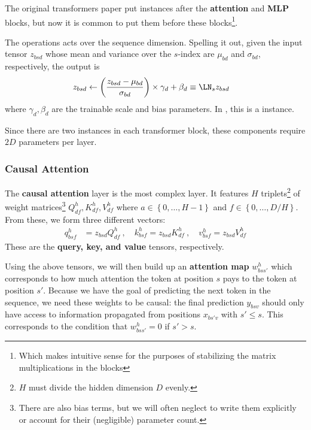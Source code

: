 \documentclass[11pt]{article}
\begin{document}
The original transformers paper \cite{vaswani2017attention} put  instances after
the \textbf{attention} and \textbf{MLP} blocks, but now it is common \cite{xiong2020layer} to put
them before these blocks\footnote{Which makes intuitive sense for the purposes of stabilizing the
matrix multiplications in the blocks}.

The  operations acts over the sequence dimension. Spelling it out, given the
input tensor $ z _{ bsd } $ whose mean and variance over the $ s $-index are $ \mu _{ bd } $ and $
\sigma _{ bd } $, respectively, the  output is
\begin{align}
  z _{ bsd } &\leftarrow \left ( \frac{ z _{ bsd } - \mu _{ bd } }{ \sigma _{ bd } } \right )\times \gamma _{ d }
  + \beta _{ d } \equiv \LN _{ s } z _{ bsd}
\end{align}
where $ \gamma _{ d }, \beta  _{ d } $ are the trainable scale and bias parameters. In
, this is a  instance.

Since there are two  instances in each transformer block, these components require
$ 2D $ parameters per layer.


\subsubsection{Causal Attention \label{subsubsec:attn_layer} }

The \textbf{causal attention} layer is the most complex layer. It features $ H $  triplets\footnote{$ H $
must divide the hidden dimension $ D $ evenly.} of weight matrices\footnote{There are also bias
terms, but we will often neglect to write them explicitly or account for their (negligible)
parameter count.}  $ Q ^{ h } _{ d f }, K ^{ h } _{ df }, V ^{ h } _{ df }  $
where $ a \in \left \{ 0, \ldots, H-1 \right \} $ and $ f \in \left \{ 0, \ldots, D/H \right \} $.
From these, we form three different vectors:
\begin{align}
  q ^{ h }_{ bsf } &= z _{ bsd } Q ^{ h }_{ df } \ , \quad
  k ^{ h }_{ bsf } = z _{ bsd } K ^{ h }_{ df }  \ , \quad
  v ^{ h }_{ bsf } = z _{ bsd } V ^{ h }_{ df }
\end{align}
These are the \textbf{query, key, and value} tensors, respectively.

Using the above tensors, we will then build up an \textbf{attention map}  $ w ^{ h }_{ bss' } $
which corresponds to how much attention the token at position $ s $ pays to the token at
position $ s' $.  Because we have the goal of predicting the
next token in the sequence, we need these weights to be causal: the final prediction $ y _{ bsv } $
should only have access to information propagated from positions $ x _{ bs'v } $ with $ s' \le s $.
This corresponds to the condition that $ w ^{ h }_{ bss' } = 0  $ if  $ s' > s  $.
\end{document}
